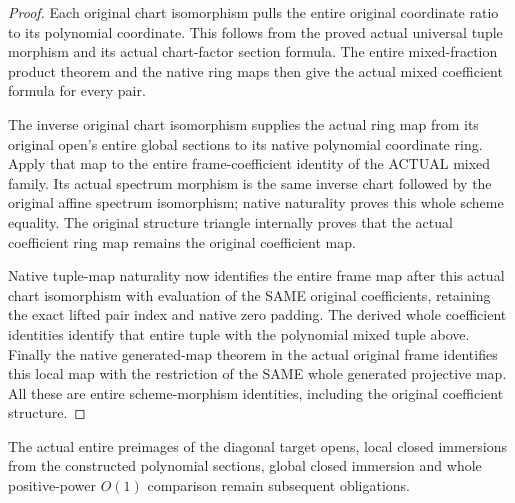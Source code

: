 \begin{proof}
Each original chart isomorphism pulls the entire original coordinate ratio
to its polynomial coordinate. This follows
from the proved actual universal tuple morphism and its actual chart-factor
section formula. The entire mixed-fraction product theorem and the native
ring maps then give the actual mixed coefficient formula for every pair.

The inverse original chart isomorphism supplies the actual ring map from its
original open's entire global sections to its native polynomial coordinate
ring. Apply that map to the entire frame-coefficient identity of the ACTUAL
mixed family. Its actual spectrum morphism is the same inverse chart followed
by the original affine spectrum isomorphism; native naturality proves this
whole scheme equality. The original structure triangle internally proves
that the actual coefficient ring map remains the original coefficient map.

Native tuple-map naturality now identifies the entire frame map after this
actual chart isomorphism with evaluation of the SAME original coefficients,
retaining the exact lifted pair index and native zero padding. The derived
whole coefficient identities identify that entire tuple with the polynomial
mixed tuple above. Finally the native generated-map theorem in the actual
original frame identifies this local map with the restriction of the SAME
whole generated projective map. All these are entire scheme-morphism
identities, including the original coefficient structure.
\end{proof}
The actual entire preimages of the diagonal target opens, local closed
immersions from the constructed polynomial sections, global closed immersion
and whole positive-power $O(1)$ comparison remain subsequent obligations.

